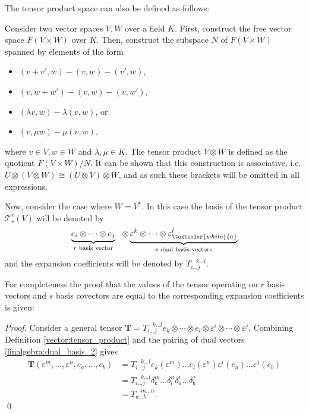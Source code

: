     The tensor product space can also be defined as follows:
    \begin{adefinition}
        Consider two vector spaces $V,W$ over a field $K$. First, construct the free vector space $F(V\times W)$ over $K$. Then, construct the subspace $N$ of $F(V\times W)$ spanned by elements of the form
        \begin{itemize}
            \item $(v+v',w) - (v,w) - (v',w)$,
            \item $(v,w+w') - (v,w) - (v,w')$,
            \item $(\lambda v,w) - \lambda(v,w)$, or
            \item $(v,\mu w) - \mu(v,w)$,
        \end{itemize}
        where $v\in V,w\in W$ and $\lambda,\mu\in K$. The tensor product $V\otimes W$ is defined as the quotient $F(V\times W)/N$. It can be shown that this construction is associative, i.e. $U\otimes(V\otimes W)\cong(U\otimes V)\otimes W$, and as such these brackets will be omitted in all expressions.

        Now, consider the case where $W=V^*$. In this case the basis of the tensor product $\mathcal{T}^r_s(V)$ will be denoted by
        \[\underbrace{e_i\otimes\cdots\otimes e_j}_{r\text{ basis vector}}\ \ \otimes\underbrace{\varepsilon^k\otimes\cdots\otimes \varepsilon^l_{\textcolor{white}{a}}}_{s\text{ dual basis vectors}}\]
        and the expansion coefficients will be denoted by $T_{i\ldots j}^{\ \ \ \ k\ldots l}$.
    \end{adefinition}


    For completeness the proof that the values of the tensor operating on $r$ basis vectors and $s$ basis covectors are equal to the corresponding expansion coefficients is given:
    \begin{proof}
        Consider a general tensor $\mathbf{T} = T_{i\ldots j}^{\ \ \ \ k\ldots l} e_k\otimes\cdots\otimes e_l\otimes\varepsilon^i\otimes\cdots\otimes\varepsilon^j$. Combining Definition \ref{vector:tensor_product} and the pairing of dual vectors \eqref{linalgebra:dual_basis_2} gives
        \begin{align*}
            \mathbf{T}(\varepsilon^m, \ldots, \varepsilon^n, e_a, \ldots, e_b) &= T_{i\ldots j}^{\ \ \ \ k\ldots l}e_k(\varepsilon^m)\ldots e_l(\varepsilon^n)\varepsilon^i(e_a)\ldots\varepsilon^j(e_b)\\
            &= T_{i\ldots j}^{\ \ \ \ k\ldots l}\delta_k^m\ldots\delta_l^n\delta_a^i\ldots\delta_b^j\\
            &= T_{a\ldots b}^{\ \ \ \ m\ldots n}.
        \end{align*}
        \qed
    \end{proof}

